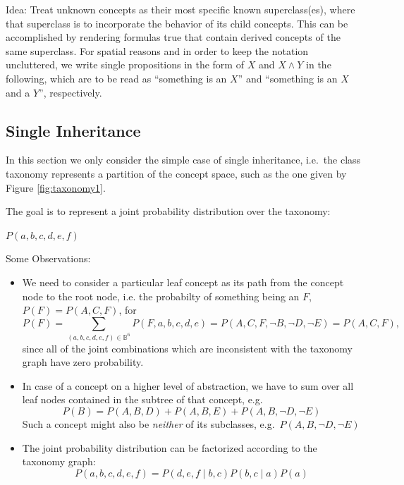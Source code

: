 \documentclass[12pt,a4paper]{article}
\begin{document}
\newcommand{\norm}{\textit{Norm}}

Idea: Treat unknown concepts as their most specific known 
superclass(es), where that superclass is to incorporate the behavior 
of its child concepts. This can be accomplished by rendering 
formulas true that contain derived concepts of the same superclass. 
For spatial reasons and in order to keep the notation uncluttered, 
we write single propositions in the form of $X$ and $X\land Y$ in 
the following, which are to be read as ``something is an $X$'' and 
``something is an $X$ and a $Y$'', respectively.

\subsection{Single Inheritance}

In this section we only consider the simple case of single 
inheritance, i.e.\ the class taxonomy represents a partition of the 
concept space, such as the one given by Figure \ref{fig:taxonomy1}.

The goal is to represent a joint probability distribution over the 
taxonomy:

$P(a,b,c,d,e,f)$

Some Observations: 
\begin{itemize}

	\item We need to consider a particular leaf concept as its path 
	from the concept node to the root node, i.e. the probabilty of 
	something being an $F$, $P(F) = P(A, C, F)$, for
	$$P(F)=\sum_{(a,b,c,d,e,f)\in\mathds{B}^{6}}P(F,a,b,c,d,e)=P(A,C,F
	,\lnot B,\lnot D,\lnot E)=P(A, C, F),$$ since all of the joint 
	combinations which are inconsistent with the taxonomy graph have 
	zero probability.
	
	\item In case of a concept on a higher level of abstraction, we 
	have to sum over all leaf nodes contained in the subtree of that 
	concept, e.g.\ $$P(B)=P(A,B,D)+P(A,B,E)+P(A,B,\lnot D,\lnot E)$$ 
	Such a concept might also be \emph{neither} of its subclasses, 
	e.g.\ $P(A,B,\lnot D,\lnot E)$ 
	
	\item The joint probability distribution can be factorized 
	according to the taxonomy graph: $$ P(a,b,c,d,e,f)=P(d,e,f\mid 
	b,c)P(b,c\mid a)P(a) $$
    
\end{itemize}
\end{document}
